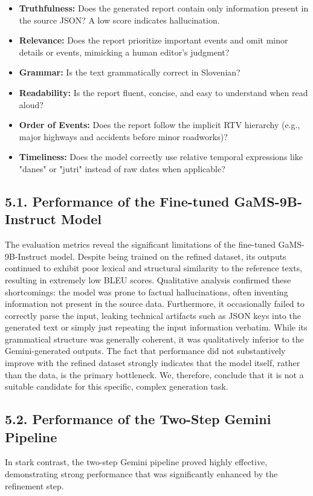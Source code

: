 \documentclass[fleqn,moreauthors,10pt]{ds_report}
\begin{document}
\begin{itemize}
    \item \textbf{Truthfulness:} Does the generated report contain only information present in the source JSON? A low score indicates hallucination.
    \item \textbf{Relevance:} Does the report prioritize important events and omit minor details or events, mimicking a human editor's judgment?
    \item \textbf{Grammar:} Is the text grammatically correct in Slovenian?
    \item \textbf{Readability:} Is the report fluent, concise, and easy to understand when read aloud?
    \item \textbf{Order of Events:} Does the report follow the implicit RTV hierarchy (e.g., major highways and accidents before minor roadworks)?
    \item \textbf{Timeliness:} Does the model correctly use relative temporal expressions like "danes" or "jutri" instead of raw dates when applicable?
\end{itemize}

\subsection*{5.1. Performance of the Fine-tuned GaMS-9B-Instruct Model}
The evaluation metrics reveal the significant limitations of the fine-tuned GaMS-9B-Instruct model. Despite being trained on the refined dataset, its outputs continued to exhibit poor lexical and structural similarity to the reference texts, resulting in extremely low BLEU scores. Qualitative analysis confirmed these shortcomings: the model was prone to factual hallucinations, often inventing information not present in the source data. Furthermore, it occasionally failed to correctly parse the input, leaking technical artifacts such as JSON keys into the generated text or simply just repeating the input information verbatim. While its grammatical structure was generally coherent, it was qualitatively inferior to the Gemini-generated outputs. The fact that performance did not substantively improve with the refined dataset strongly indicates that the model itself, rather than the data, is the primary bottleneck. We, therefore, conclude that it is not a suitable candidate for this specific, complex generation task.

\subsection*{5.2. Performance of the Two-Step Gemini Pipeline}
In stark contrast, the two-step Gemini pipeline proved highly effective, demonstrating strong performance that was significantly enhanced by the refinement step.
\end{document}

